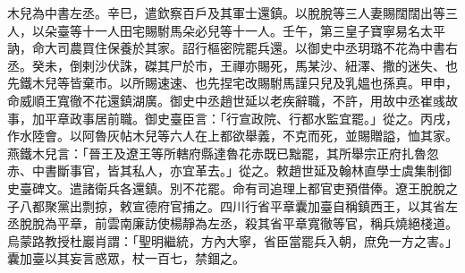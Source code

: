 \begin{pinyinscope}
木兒為中書左丞。辛巳，遣欽察百戶及其軍士還鎮。以脫脫等三人妻賜闊闊出等三人，以朵臺等十一人田宅賜駙馬朵必兒等十一人。壬午，第三皇子寶寧易名太平訥，命大司農買住保養於其家。詔行樞密院罷兵還。以御史中丞玥璐不花為中書右丞。癸未，倒剌沙伏誅，磔其尸於市，王禪亦賜死，馬某沙、紐澤、撒的迷失、也先鐵木兒等皆棄市。以所賜速速、也先捏宅改賜駙馬謹只兒及乳媼也孫真。甲申，命威順王寬徹不花還鎮湖廣。御史中丞趙世延以老疾辭職，不許，用故中丞崔彧故事，加平章政事居前職。御史臺臣言：「行宣政院、行都水監宜罷。」從之。丙戌，作水陸會。以阿魯灰帖木兒等六人在上都欲舉義，不克而死，並賜贈謚，恤其家。燕鐵木兒言：「晉王及遼王等所轄府縣達魯花赤既已黜罷，其所舉宗正府扎魯忽赤、中書斷事官，皆其私人，亦宜革去。」從之。敕趙世延及翰林直學士虞集制御史臺碑文。遣諸衛兵各還鎮。別不花罷。命有司追理上都官吏預借俸。遼王脫脫之子八都聚黨出剽掠，敕宣德府官捕之。四川行省平章囊加臺自稱鎮西王，以其省左丞脫脫為平章，前雲南廉訪使楊靜為左丞，殺其省平章寬徹等官，稱兵燒絕棧道。烏蒙路教授杜巖肖謂：「聖明繼統，方內大寧，省臣當罷兵入朝，庶免一方之害。」囊加臺以其妄言惑眾，杖一百七，禁錮之。




\end{pinyinscope}
